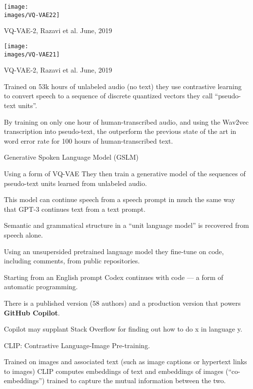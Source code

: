 {{

\centerline{\texttt{[image: \\images/VQ-VAE22]}}

\vfill
VQ-VAE-2, Razavi et al. June, 2019


\centerline{\texttt{[image: \\images/VQ-VAE21]}}

\vfill
VQ-VAE-2, Razavi et al. June, 2019



\vfill
Trained on 53k hours of unlabeled audio (no text) they use {\color{red} contrastive learning} to convert speech to a sequence of discrete {\color{red} quantized vectors} they call ``pseudo-text units''.

\vfill
By training on only one hour of human-transcribed audio, and using the Wav2vec transcription into pseudo-text, the outperform the previous state of the
art in word error rate for 100 hours of human-transcribed text.



Generative Spoken Language Model (GSLM)

\vfill
Using a form of {\color{red} VQ-VAE} They then train a generative model of the sequences of pseudo-text units learned from unlabeled audio.


\vfill
This model can continue speech from a speech prompt in much the same way that GPT-3 continues text from a text prompt.

\vfill
Semantic and grammatical structure in a ``unit language model'' is recovered
from speech alone.


Using an {\color{red} unsupersided pretrained language model} they fine-tune on code, including comments, from public repositories.

\vfill
Starting from an English prompt Codex continues with code --- a form of automatic programming.

\vfill
There is a published version (58 authors) and a production version that powers {\bf GitHub Copilot}.

\vfill
Copilot may supplant Stack Overflow for finding out how to do x in language y.


CLIP: {\color{red} Contrastive} Language-Image Pre-training.

\vfill
Trained on images and associated text (such as image captions or hypertext links to images) CLIP computes embeddings of text and embeddings of images
(``co-embeddings'') trained to capture the mutual information between the two.

}}
